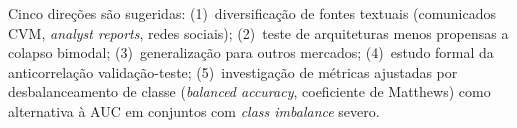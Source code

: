 \documentclass[
    12pt,
    openright,
    oneside,
    a4paper,
    english,
    brazil
]{abntex2}
\begin{document}
Cinco direções são sugeridas: (1)~diversificação de fontes textuais (comunicados CVM, \textit{analyst reports}, redes sociais); (2)~teste de arquiteturas menos propensas a colapso bimodal; (3)~generalização para outros mercados; (4)~estudo formal da anticorrelação validação-teste; (5)~investigação de métricas ajustadas por desbalanceamento de classe (\textit{balanced accuracy}, coeficiente de Matthews) como alternativa à AUC em conjuntos com \textit{class imbalance} severo.


\postextual



\end{document}
